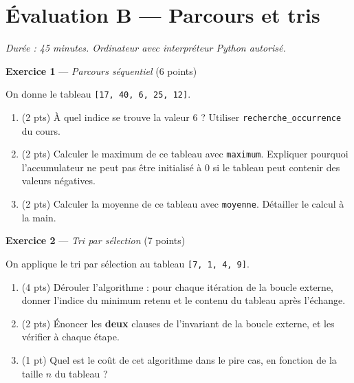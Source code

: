 \section*{Évaluation B --- Parcours et tris}
\textit{Durée : 45 minutes. Ordinateur avec interpréteur Python autorisé.}


\bigskip

\textbf{Exercice 1} --- \textit{Parcours séquentiel} \hfill (6 points)

On donne le tableau \lstinline{[17, 40, 6, 25, 12]}.

\begin{enumerate}
  \item (2 pts) À quel indice se trouve la valeur $6$ ? Utiliser \lstinline{recherche_occurrence} du cours.
  \item (2 pts) Calculer le maximum de ce tableau avec \lstinline{maximum}. Expliquer pourquoi l'accumulateur ne peut pas être initialisé à $0$ si le tableau peut contenir des valeurs négatives.
  \item (2 pts) Calculer la moyenne de ce tableau avec \lstinline{moyenne}. Détailler le calcul à la main.
\end{enumerate}

\bigskip

\textbf{Exercice 2} --- \textit{Tri par sélection} \hfill (7 points)

On applique le tri par sélection au tableau \lstinline{[7, 1, 4, 9]}.

\begin{enumerate}
  \item (4 pts) Dérouler l'algorithme : pour chaque itération de la boucle externe, donner l'indice du minimum retenu et le contenu du tableau après l'échange.
  \item (2 pts) Énoncer les \textbf{deux} clauses de l'invariant de la boucle externe, et les vérifier à chaque étape.
  \item (1 pt) Quel est le coût de cet algorithme dans le pire cas, en fonction de la taille $n$ du tableau ?
\end{enumerate}

